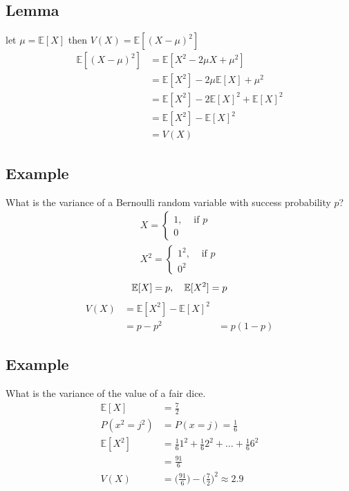 \documentclass{article}
\theoremstyle{mytheoremstyle}
\theoremstyle{mytheoremstyle}
\theoremstyle{myproblemstyle}
\begin{document}
    \subsection*{Lemma}
    let $\mu = \mathbb{E}[X]$ then $V(X) = \mathbb{E}[(X-\mu)^2]$
    \begin{align*}
        \mathbb{E}[(X-\mu)^2] &= \mathbb{E}[X^2 - 2\mu X + \mu^2] \\
        &= \mathbb{E}[X^2] - 2\mu\mathbb{E}[X] + \mu^2 \\
        &= \mathbb{E}[X^2] - 2\mathbb{E}[X]^2 + \mathbb{E}[X]^2 \\
        &= \mathbb{E}[X^2] - \mathbb{E}[X]^2 \\
        &= V(X)
    \end{align*}

    \subsection*{Example}
    What is the variance of a Bernoulli random variable with success probability
    $p$?
    \begin{align*}
        X = \begin{cases}
            1, &\text{ if }p\\
            0
        \end{cases} \\
        X^2 = \begin{cases}
            1^2, &\text{ if }p\\
            0^2
        \end{cases}
    \end{align*}
    \[
        \mathbb{E}[X] = p,\quad \mathbb{E}[X^2] = p \\
    \]
    \begin{align*}
        V(X) &= \mathbb{E}[X^2] - \mathbb{E}[X]^2 \\
        &= p-p^2
        &= p(1-p)
    \end{align*}

    \subsection*{Example}
    What is the variance of the value of a fair dice.
    \begin{align*}
        \mathbb{E}[X] &= \frac{7}{2} \\
        P(x^2 = j^2) &= P(x=j) = \frac{1}{6} \\
        \mathbb{E}[X^2] &= \frac{1}{6} 1^2 + \frac{1}{6} 2^2 + \dots + \frac{1}{6} 6^2 \\
        &= \frac{91}{6} \\
        V(X) &= \Big(\frac{91}{6}\Big)-\Big(\frac{7}{2}\Big)^2 \approx 2.9
    \end{align*}
\end{document}
